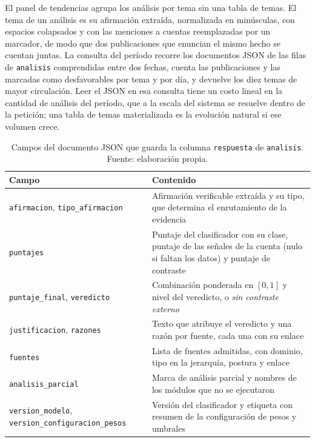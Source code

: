 El panel de tendencias agrupa los análisis por tema sin una tabla de temas. El tema de un análisis es su afirmación extraída, normalizada en minúsculas, con espacios colapsados y con las menciones a cuentas reemplazadas por un marcador, de modo que dos publicaciones que enuncian el mismo hecho se cuentan juntas. La consulta del período recorre los documentos JSON de las filas de \texttt{analisis} comprendidas entre dos fechas, cuenta las publicaciones y las marcadas como desfavorables por tema y por día, y devuelve los diez temas de mayor circulación. Leer el JSON en esa consulta tiene un costo lineal en la cantidad de análisis del período, que a la escala del sistema se resuelve dentro de la petición; una tabla de temas materializada es la evolución natural si ese volumen crece.

\begin{table}[t]
  \centering
  \small
  \caption{Campos del documento JSON que guarda la columna \texttt{respuesta} de \texttt{analisis}. Fuente: elaboración propia.}
  \label{tab:respuesta-json}
  \begin{tabular}{@{}l >{\raggedright\arraybackslash}p{9.6cm}@{}}
    \hline
    \textbf{Campo} & \textbf{Contenido} \\
    \hline
    \texttt{afirmacion}, \texttt{tipo\_afirmacion} & Afirmación verificable extraída y su tipo, que determina el enrutamiento de la evidencia \\
    \texttt{puntajes} & Puntaje del clasificador con su clase, puntaje de las señales de la cuenta (nulo si faltan los datos) y puntaje de contraste \\
    \texttt{puntaje\_final}, \texttt{veredicto} & Combinación ponderada en $[0, 1]$ y nivel del veredicto, o \textit{sin contraste externo} \\
    \texttt{justificacion}, \texttt{razones} & Texto que atribuye el veredicto y una razón por fuente, cada una con su enlace \\
    \texttt{fuentes} & Lista de fuentes admitidas, con dominio, tipo en la jerarquía, postura y enlace \\
    \texttt{analisis\_parcial} & Marca de análisis parcial y nombres de los módulos que no se ejecutaron \\
    \texttt{version\_modelo}, \texttt{version\_configuracion\_pesos} & Versión del clasificador y etiqueta con resumen de la configuración de pesos y umbrales \\
    \hline
  \end{tabular}
\end{table}

